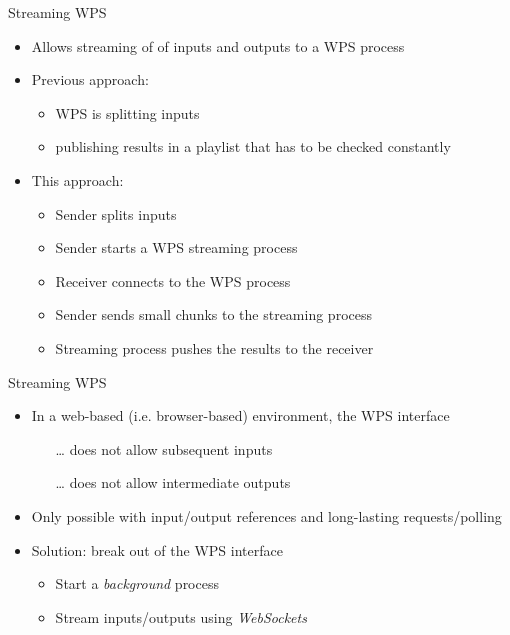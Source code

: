 \documentclass[xcolor=svgnames,professionalfonts,11pt,aspectratio=43]{beamer}
\begin{document}

\begin{frame}[t]{Streaming WPS}
  \begin{itemize}
    \item Allows streaming of of inputs and outputs to a WPS process
    \pause
    \item Previous approach:
    \begin{itemize}
      \item WPS is splitting inputs
      \item publishing results in a playlist that has to be checked constantly
    \end{itemize}
    \pause
    \item This approach:
    \begin{itemize}
      \item Sender splits inputs
      \item Sender starts a WPS streaming process
      \item Receiver connects to the WPS process
      \item Sender sends small chunks to the streaming process
      \item Streaming process pushes the results to the receiver
    \end{itemize}
  \end{itemize}
\end{frame}

\begin{frame}[t]{Streaming WPS}
  \begin{itemize}
    \item In a web-based (i.e. browser-based) environment, the WPS interface
    \begin{itemize}
      \item[\dots] does not allow subsequent inputs
      \item[\dots] does not allow intermediate outputs
    \end{itemize}
    \item Only possible with input/output references and long-lasting requests/polling
    \pause
    \item Solution: break out of the WPS interface
    \begin{itemize}
      \item Start a \emph{background} process
      \item Stream inputs/outputs using \emph{WebSockets}
    \end{itemize}
  \end{itemize}
\end{frame}
\end{document}
